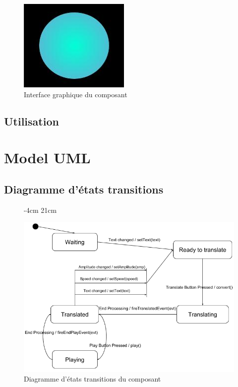 \documentclass[a4paper,11pt]{article}
\begin{document}
	\begin{figure}[H]
		\begin{center}
			\includegraphics[scale=0.5]{comdescpicture.jpg}
			\caption{Interface graphique du composant}
			\label{Interface graphique du composant}
		\end{center}
	\end{figure}
    \subsection{Utilisation}
    

    \section{Model UML}
    \subsection{Diagramme d'états transitions}
     \begin{figure}[H]
    	 -4cm 21cm
    	\begin{center}
    		\includegraphics[scale=0.8]{etatsdiag.png}
    		\caption{Diagramme d'états transitions du composant}
    		\label{Diagramme d'états transitions du composant}
    	\end{center}
    \end{figure}
\end{document}
